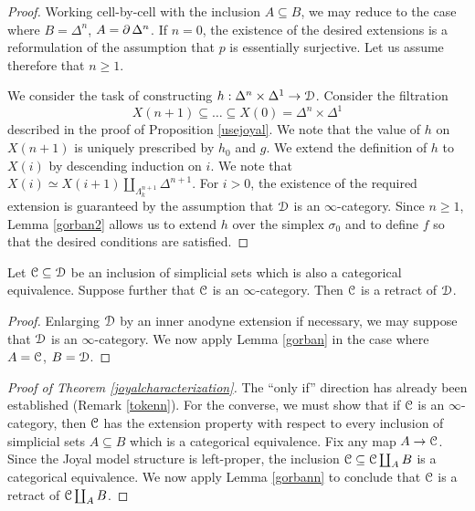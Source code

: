 \begin{proof}
Working cell-by-cell with the inclusion $A \subseteq B$, we may reduce to the case where $B = \Delta^n$, $A = \operatorname{\partial} \Delta^n$. If $n = 0$, the existence of the desired extensions is a reformulation of the assumption that $p$ is essentially surjective. Let us assume therefore that $n \geq 1$.

We consider the task of constructing $h: \Delta^n \times \Delta^1 \rightarrow \operatorname{\mathcal{D}}$. Consider the filtration
$$ X(n+1) \subseteq \ldots \subseteq X(0) = \Delta^n \times \Delta^1 $$
described in the proof of Proposition \ref{usejoyal}. We note that the value of $h$ on $X(n+1)$ is uniquely prescribed by $h_0$ and $g$. We extend the definition of $h$ to $X(i)$ by descending induction on $i$. We note that $X(i) \simeq X(i+1) \coprod_{ \Lambda^{n+1}_k} \Delta^{n+1}$. For $i > 0$, the existence of the required extension is guaranteed by the assumption that $\operatorname{\mathcal{D}}$ is an $\infty$-category. Since $n \geq 1$, Lemma \ref{gorban2}  allows us to extend $h$ over the simplex $\sigma_0$ and to define $f$ so that the desired conditions are satisfied.
\end{proof}

\begin{lemma}\label{gorbann}
Let $\operatorname{\mathcal{C}} \subseteq \operatorname{\mathcal{D}}$ be an inclusion of simplicial sets which is also a categorical equivalence. Suppose further that $\operatorname{\mathcal{C}}$ is an $\infty$-category. Then $\operatorname{\mathcal{C}}$ is a retract of $\operatorname{\mathcal{D}}$.
\end{lemma}

\begin{proof}
Enlarging $\operatorname{\mathcal{D}}$ by an inner anodyne extension if necessary, we may suppose that $\operatorname{\mathcal{D}}$ is an $\infty$-category. We now apply Lemma \ref{gorban} in the case
where $A = \operatorname{\mathcal{C}}$, $B = \operatorname{\mathcal{D}}$.
\end{proof}

\begin{proof}[Proof of Theorem \ref{joyalcharacterization}]
The ``only if'' direction has already been established (Remark \ref{tokenn}). 
For the converse, we must show that if $\operatorname{\mathcal{C}}$ is an $\infty$-category, then $\operatorname{\mathcal{C}}$ has the extension property with respect to every inclusion of simplicial sets
$A \subseteq B$ which is a categorical equivalence. Fix any map $A \rightarrow \operatorname{\mathcal{C}}$. Since the Joyal model structure is left-proper, the inclusion
$\operatorname{\mathcal{C}} \subseteq \operatorname{\mathcal{C}} \coprod_{A} B$ is a categorical equivalence. We now apply Lemma \ref{gorbann} to conclude that $\operatorname{\mathcal{C}}$ is a retract of $\operatorname{\mathcal{C}} \coprod_{A} B$.
\end{proof}

